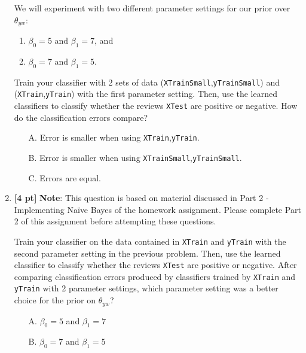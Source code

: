 \documentclass{article}
\begin{document}
\begin{enumerate}
    We will experiment with two different parameter settings for our prior over $\theta_{yw}$: 
    \begin{enumerate}
        \item $\beta_0=5$ and $\beta_1=7$, and 
        \item $\beta_0=7$ and $\beta_1=5$.
    \end{enumerate}
    Train your classifier with 2 sets of data (\texttt{XTrainSmall},\texttt{yTrainSmall}) and (\texttt{XTrain},\texttt{yTrain}) with the first parameter setting. Then, use the learned classifiers to classify whether the reviews \texttt{XTest} are positive or negative. How do the classification errors compare?
    \begin{itemize}
        \item[A.] Error is smaller when using \texttt{XTrain},\texttt{yTrain}.
        \item[B.] Error is smaller when using \texttt{XTrainSmall},\texttt{yTrainSmall}.
        \item[C.] Errors are equal.
    \end{itemize}
    \begin{tcolorbox}[width=\linewidth/3,height=1.5cm]
    \end{tcolorbox}
    \newpage
    \item \textbf{[4 pt]} \textbf{Note}: This question is based on material discussed in Part 2 - Implementing Na{\"i}ve Bayes of the homework assignment. Please complete Part 2 of this assignment before attempting these questions.
    
    Train your classifier on the data contained in
    \texttt{XTrain} and \texttt{yTrain} with the second parameter setting in the previous problem. Then, use the learned classifier to classify whether the reviews \texttt{XTest} are positive or negative. After comparing classification errors produced by classifiers trained by \texttt{XTrain} and \texttt{yTrain} with 2 parameter settings, which parameter setting was a better choice for the prior on $\theta_{yw}$?
    \begin{itemize}
        \item[A.] $\beta_0=5$ and $\beta_1=7$
        \item[B.] $\beta_0=7$ and $\beta_1=5$
    \end{itemize}
    \begin{tcolorbox}[width=\linewidth/3,height=1.5cm]
    \end{tcolorbox}
    

\end{enumerate}
\end{document}
